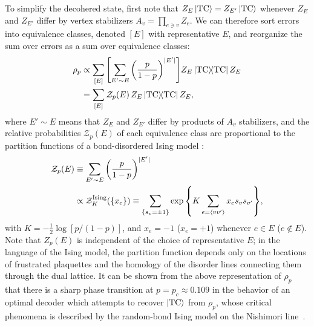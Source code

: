 To simplify the decohered state, first note that $Z_E \ket{\text{TC}} = Z_{E'} \ket{\text{TC}}$ whenever $Z_E$ and $Z_{E'}$ differ by vertex stabilizers $A_v = \prod_{e \ni v} Z_e$. We can therefore sort errors into equivalence classes, denoted $[E]$ with representative $E$, and reorganize the sum over errors as a sum over equivalence classes:
\begin{equation}
    \begin{split}
        \rho_p &\propto \sum_{[E]} \qty[ \sum_{E' \sim E} \qty( \frac{p}{1-p} )^{|E'|}  ] Z_E \dyad{\TC} Z_E \\
        &= \sum_{[E]} \mathcal{Z}_p(E) \, Z_E \dyad{\TC} Z_E ,
    \end{split}
\end{equation}
where $E' \sim E$ means that $Z_E$ and $Z_{E'}$ differ by products of $A_v$ stabilizers, and the relative probabilities $\mathcal{Z}_p(E)$ of each equivalence class are proportional to the partition functions of a bond-disordered Ising model \cite{dennis_topological_2002}:
\begin{equation}
    \begin{split}
        \mathcal{Z}_p(E) &\equiv \sum_{E' \sim E} \qty( \frac{p}{1-p} )^{|E'|} \\
        &\propto \mathcal{Z}^{\text{Ising}}_K(\qty{x_e}) \equiv \sum_{\qty{s_v = \pm 1}} \exp \qty{ K \sum_{e = \expval{v v'}} x_e s_v s_{v'} } ,
    \end{split}
\end{equation}
with $K = - \frac{1}{2} \log[p / (1 - p)]$, and $x_e = -1$ ($x_e = +1$) whenever $e \in E$ ($e \not\in E$). Note that $Z_p(E)$ is independent of the choice of representative $E$; in the language of the Ising model, the partition function depends only on the locations of frustrated plaquettes and the homology of the disorder lines connecting them through the dual lattice. It can be shown from the above representation of $\rho_p$ that there is a sharp phase transition at $p = p_c \approx 0.109$ in the behavior of an optimal decoder which attempts to recover $\ket{\text{TC}}$ from $\rho_p$, whose critical phenomena is described by the random-bond Ising model on the Nishimori line~\cite{dennis_topological_2002,fan_diagnostics_2024}. 


